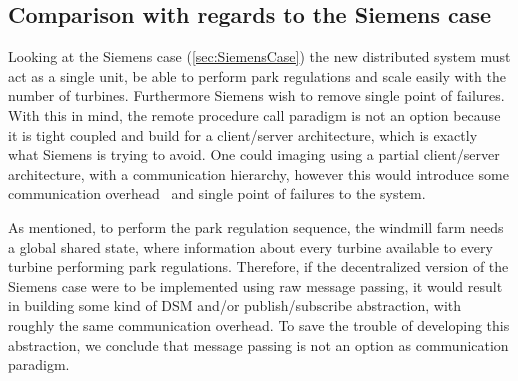%	

\subsection{Comparison with regards to the Siemens case}
Looking at the Siemens case (\cref{sec:SiemensCase}) the new distributed system must act as a single unit, be able to perform park regulations and scale easily with the number of turbines. Furthermore Siemens wish to remove single point of failures. With this in mind, the remote procedure call paradigm is not an option because it is tight coupled and build for a client/server architecture, which is exactly what Siemens is trying to avoid. One could imaging using a partial client/server architecture, with a communication hierarchy, however this would introduce some communication overhead~\cite{Yu1997JavaDSM} and single point of failures to the system.

As mentioned, to perform the park regulation sequence, the windmill farm needs a global shared state, where information about every turbine available to every turbine performing park regulations. Therefore, if the decentralized version of the Siemens case were to be implemented using raw message passing, it would result in building some kind of DSM and/or publish/subscribe abstraction, with roughly the same communication overhead. To save the trouble of developing this abstraction, we conclude that message passing is not an option as communication paradigm.

